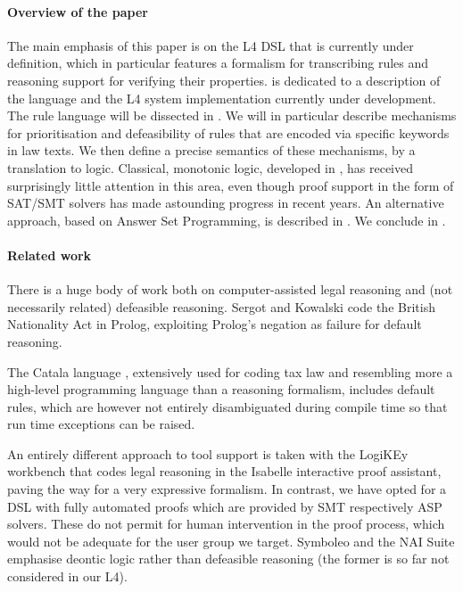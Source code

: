 \paragraph{Overview of the paper}
The main emphasis of this paper is on the L4 DSL that is currently under
definition, which in particular features a formalism for transcribing rules
and reasoning support for verifying their properties.  is dedicated to a description of the language
and the L4 system implementation currently under development. The rule
language will be dissected in . We will in
particular describe mechanisms for prioritisation and defeasibility of rules
that are encoded via specific keywords in law texts. We then define a precise
semantics of these mechanisms, by a translation to logic. Classical, monotonic
logic, developed in , has received surprisingly
little attention in this area, even though proof support in the form of
SAT/SMT solvers has made astounding progress in recent years. An alternative
approach, based on Answer Set Programming, is described in
. We conclude in .


\paragraph{Related work}

There is a huge body of work both on computer-assisted legal reasoning and
(not necessarily related) defeasible reasoning. Sergot and Kowalski
\cite{sergot_kowalski_etal__british_nationality_acm_1986,kowalski_legislation_logic_programs_1995}
code the British Nationality Act in Prolog, exploiting Prolog's negation as
failure for default reasoning.



The Catala language \cite{merigoux_chataing_protzenko_cata_icfp_2021},
extensively used for coding tax law and resembling more a high-level
programming language than a reasoning formalism, includes default rules, which
are however not entirely disambiguated during compile time so that run time
exceptions can be raised.

An entirely different approach to tool support is taken with the LogiKEy \cite{benzmueller_etal_logikey_2020}
workbench that codes legal reasoning in the Isabelle interactive proof assistant, paving
the way for a very expressive formalism. In contrast, we have opted for a DSL
with fully automated proofs which are provided by SMT respectively ASP solvers. These do not permit for human intervention in the proof process, which would not be adequate for the user group we target. Symboleo
\cite{sarifi_parvizimosaed_amyot_logrippo_mylopoulos_Symboleo_spec_legal_contracts_2020}
and the NAI Suite
\cite{libal_steen_nai_suite_draft_reason_legal_texts_jurix_2019} emphasise
deontic logic rather than defeasible reasoning (the former is so far not
considered in our L4).

